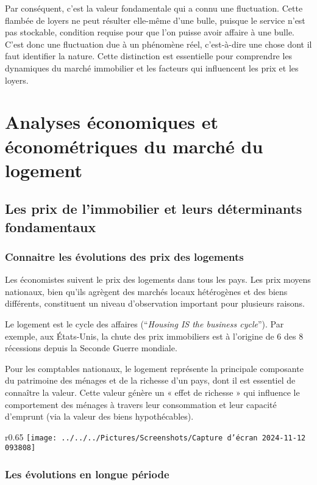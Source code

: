 \documentclass[a4paper, 12pt]{report}
\begin{document}
Par conséquent, c’est la valeur fondamentale qui a connu une fluctuation. Cette flambée de loyers ne peut résulter elle-même d’une bulle, puisque le service n’est pas stockable, condition requise pour que l’on puisse avoir affaire à une bulle. C’est donc une fluctuation due à un phénomène réel, c’est-à-dire une chose dont il faut identifier la nature. Cette distinction est essentielle pour comprendre les dynamiques du marché immobilier et les facteurs qui influencent les prix et les loyers.

\chapter{Analyses économiques et économétriques du marché du logement}

\section{Les prix de l’immobilier et leurs déterminants fondamentaux}

\subsection{Connaitre les évolutions des prix des logements}

Les économistes suivent le prix des logements dans tous les pays. Les prix moyens nationaux, bien qu’ils agrègent des marchés locaux hétérogènes et des biens différents, constituent un niveau d’observation important pour plusieurs raisons.

Le logement est le cycle des affaires (“\textit{Housing IS the business cycle}”). Par exemple, aux États-Unis, la chute des prix immobiliers est à l’origine de 6 des 8 récessions depuis la Seconde Guerre mondiale.

Pour les comptables nationaux, le logement représente la principale composante du patrimoine des ménages et de la richesse d’un pays, dont il est essentiel de connaître la valeur. Cette valeur génère un « effet de richesse » qui influence le comportement des ménages à travers leur consommation et leur capacité d’emprunt (via la valeur des biens hypothécables).
\newpage
\begin{wrapfigure}{r}{0.65\textwidth}
	\centering
	\texttt{[image: ../../../Pictures/Screenshots/Capture d'écran 2024-11-12 093808]}
\end{wrapfigure}

\subsection{Les évolutions en longue période}
\end{document}
